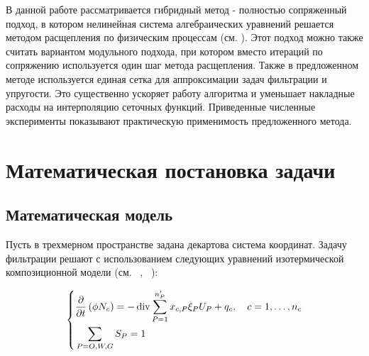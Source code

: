 \documentclass[11pt,twoside]{article}
\def\Div{\mathop{\rm div}\nolimits}
\begin{document}
В данной работе рассматривается гибридный метод - полностью сопряженный подход, в котором нелинейная система алгебраических уравнений решается методом расщепления по физическим процессам (см. \cite{Marchuk}). Этот подход можно также считать вариантом модульного подхода, при котором вместо итераций по сопряжению используется один шаг метода расщепления. Также в предложенном методе используется единая сетка для аппроксимации задач фильтрации и упругости. Это существенно ускоряет работу алгоритма и уменьшает накладные расходы на интерполяцию сеточных функций. Приведенные численные эксперименты показывают практическую применимость предложенного метода.

\section{Математическая постановка задачи}

\subsection{Математическая модель}
Пусть в трехмерном пространстве задана декартова система координат. Задачу фильтрации решают с использованием следующих уравнений изотермической композиционной модели (см. ~\cite{Aziz}, ~\cite{Chen}): 

\begin{equation}
  \label{filtration}
  \left\{
  \begin{aligned}
  &\dfrac{\partial}{\partial t} \left(\phi N_c\right) =
  - \Div\sum\limits_{P = 1}^{n_P'} x_{c,P} \xi_P U_P
  + q_c,
  \quad c=1,\dots,n_c\\
  &\sum\limits_{P = O, W, G} S_P = 1
  \end{aligned}
  \right.
\end{equation}
\end{document}
